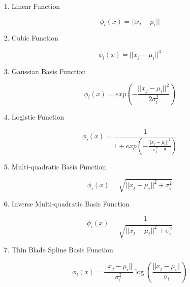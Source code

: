 \begin{enumerate}
\item Linear Function

\begin{equation}
\label{eq:rbf_linear_function}
\phi_i(x) = || x_j - \mu_i ||
\end{equation}

\item Cubic Function

\begin{equation}
\label{eq:rbf_cubic_function}
\phi_i(x) = || x_j - \mu_i ||^3
\end{equation}

\item Gaussian Basis Function

\begin{equation}
\label{eq:rbf_gaussian_function}
\phi_i(x) = exp \left( - \frac{|| x_j - \mu_i ||^2}{2\sigma_{i}^{2}} \right)
\end{equation}

\item Logistic Function

\begin{equation}
\label{eq:rbf_logistic_function}
\phi_i(x) = \frac{1}{1 + exp \left( - \frac{|| x_j - \mu_i ||^2}{\sigma_{i}^{2} - \theta} \right)}
\end{equation}

\item Multi-quadratic Basis Function

\begin{equation}
\label{eq:rbf_multiquadratic_function}
\phi_i(x) = \sqrt{|| x_j - \mu_i ||^2 + \sigma_i^2}
\end{equation}

\item Inverse Multi-quadratic Basis Function

\begin{equation}
\label{eq:rbf_inverse_multiquadratic_function}
\phi_i(x) = \frac{1}{\sqrt{|| x_j - \mu_i ||^2 + \sigma_i^2}}   
\end{equation}

\item Thin Blade Spline Basis Function

\begin{equation}
\label{eq:rbf_spline}
\phi_i(x) = \frac{|| x_j - \mu_i ||}{\sigma_i^2} \log \left( \frac{|| x_j - \mu_i ||}{\sigma_i} \right)   
\end{equation}

\end{enumerate}

